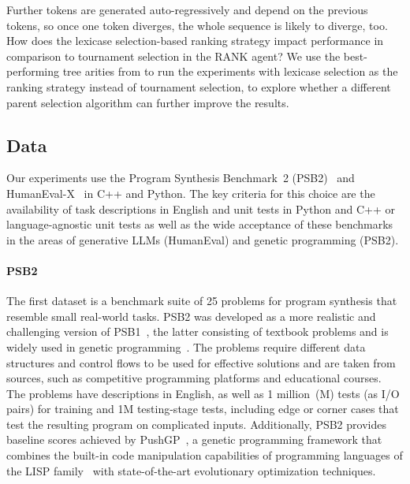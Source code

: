 Further tokens are generated auto-regressively and depend on the previous tokens, so once one token diverges, the whole sequence is likely to diverge, too. 
How does the lexicase selection-based ranking strategy impact performance in comparison to tournament selection in the RANK agent? 
We use the best-performing tree arities from \rqmultirun{} to run the experiments with lexicase selection as the ranking strategy instead of tournament selection, to explore whether a different parent selection algorithm can further improve the results.


\newpage\subsection{Data}
\label{sec:seidr-data}

Our experiments use the Program Synthesis Benchmark~2 (PSB2)~\cite{helmuth2022:applying} and HumanEval-X~\cite{zheng2023:codegeex} in C++ and Python. 
The key criteria for this choice are the availability of task descriptions in English and unit tests in Python and C++ or language-agnostic unit tests as well as the wide acceptance of these benchmarks in the areas of generative LLMs (HumanEval) and genetic programming (PSB2). 

\paragraph{PSB2}
The first dataset is a benchmark suite of 25 problems for program synthesis that resemble small real-world tasks. 
PSB2 was developed as a more realistic and challenging version of PSB1~\cite{helmuth2015:general}, the latter consisting of textbook problems and is widely used in genetic programming~\cite{sobania2022:choose}. 
The problems require different data structures and control flows to be used for effective solutions and are taken from sources, such as competitive programming platforms and educational courses. 
The problems have descriptions in English, as well as 1 million~(M) tests (as I/O pairs) for training and 1M testing-stage tests, including edge or corner cases that test the resulting program on complicated inputs. 
Additionally, PSB2 provides baseline scores achieved by PushGP~\cite{spectorAutoconstructiveEvolutionPush2001}, a genetic programming framework that combines the built-in code manipulation capabilities of programming languages of the LISP family~\cite{b.HowStrengthsLispfamily2016,c.LispSmallPieces2003,e.SyntacticExtensionsProgramming1986,grahamHundredYearLanguage,j.RecursiveFunctionsSymbolic1960} with state-of-the-art evolutionary optimization techniques.

